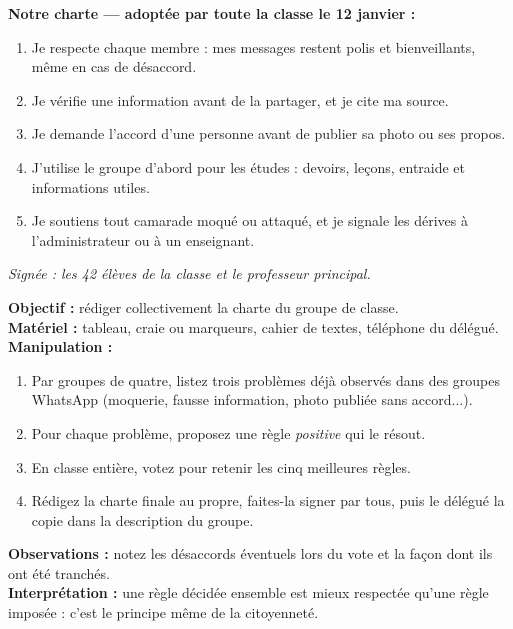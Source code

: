\documentclass[11pt]{article}
\begin{document}
\begin{exemplebox}
\textbf{Notre charte — adoptée par toute la classe le 12 janvier :}
\begin{enumerate}
\item Je respecte chaque membre : mes messages restent polis et bienveillants, même en cas de désaccord.
\item Je vérifie une information avant de la partager, et je cite ma source.
\item Je demande l'accord d'une personne avant de publier sa photo ou ses propos.
\item J'utilise le groupe d'abord pour les études : devoirs, leçons, entraide et informations utiles.
\item Je soutiens tout camarade moqué ou attaqué, et je signale les dérives à l'administrateur ou à un enseignant.
\end{enumerate}
\emph{Signée : les 42 élèves de la classe et le professeur principal.}
\end{exemplebox}

\begin{experience}
\textbf{Objectif :} rédiger collectivement la charte du groupe de classe.\\
\textbf{Matériel :} tableau, craie ou marqueurs, cahier de textes, téléphone du délégué.\\
\textbf{Manipulation :}
\begin{enumerate}
\item Par groupes de quatre, listez trois problèmes déjà observés dans des groupes WhatsApp (moquerie, fausse information, photo publiée sans accord...).
\item Pour chaque problème, proposez une règle \emph{positive} qui le résout.
\item En classe entière, votez pour retenir les cinq meilleures règles.
\item Rédigez la charte finale au propre, faites-la signer par tous, puis le délégué la copie dans la description du groupe.
\end{enumerate}
\textbf{Observations :} notez les désaccords éventuels lors du vote et la façon dont ils ont été tranchés.\\
\textbf{Interprétation :} une règle décidée ensemble est mieux respectée qu'une règle imposée : c'est le principe même de la citoyenneté.
\end{experience}
\end{document}
